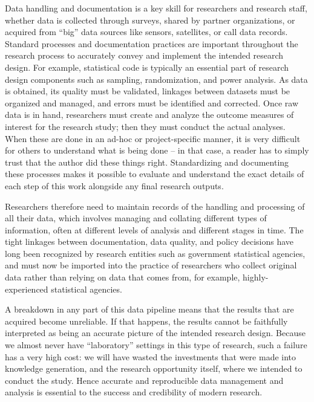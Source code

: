 Data handling and documentation is a key skill for researchers and research staff,
whether data is collected through surveys, shared by partner organizations,
or acquired from ``big'' data sources like sensors, satellites, or call data records.
Standard processes and documentation practices
are important throughout the research process to accurately convey
and implement the intended research design.\cite{vilhuber_lars_2020_3911311}
For example, statistical code is typically an essential part of
research design components such as sampling, randomization, and power analysis.
As data is obtained, its quality must be validated,
linkages between datasets must be organized and managed,
and errors must be identified and corrected.
Once raw data is in hand, researchers must create and analyze the
outcome measures of interest for the research study;
then they must conduct the actual analyses.
When these are done in an ad-hoc or project-specific manner,
it is very difficult for others to understand what is being done --
in that case, a reader has to simply trust that the author did these things right.
Standardizing and documenting these processes
makes it possible to evaluate and understand
the exact details of each step of this work
alongside any final research outputs.

Researchers therefore need to maintain records of the handling and processing of all their data,
which involves managing and collating different types of information,
often at different levels of analysis and different stages in time.
The tight linkages between documentation, data quality, and policy decisions
have long been recognized by research entities such as government statistical agencies,\cite{jepdataquality}
and must now be imported into the practice of researchers who collect original data
rather than relying on data that comes from, for example, highly-experienced statistical agencies.

A breakdown in any part of this data pipeline
means that the results that are acquired become unreliable.\cite{mccullough2008economics}
If that happens, the results cannot be faithfully interpreted
as being an accurate picture of the intended research design.
Because we almost never have ``laboratory'' settings
in this type of research,
such a failure has a very high cost:
we will have wasted the investments that were made into knowledge generation,
and the research opportunity itself,
where we intended to conduct the study.\cite{camerer2016evaluating}
Hence accurate and reproducible data management and analysis
is essential to the success and credibility of modern research.

